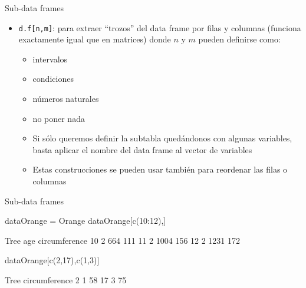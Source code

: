 \documentclass[
  ignorenonframetext,
  aspectratio=169]{beamer}
\newenvironment{Shaded}{\begin{snugshade}}{\end{snugshade}}
\newcommand{\DecValTok}[1]{\textcolor[rgb]{0.00,0.00,0.81}{#1}}
\newcommand{\FunctionTok}[1]{\textcolor[rgb]{0.00,0.00,0.00}{#1}}
\newcommand{\NormalTok}[1]{#1}
\newcommand{\OtherTok}[1]{\textcolor[rgb]{0.56,0.35,0.01}{#1}}
\newcommand{\SpecialCharTok}[1]{\textcolor[rgb]{0.00,0.00,0.00}{#1}}
\providecommand{\tightlist}{%
  \setlength{\itemsep}{0pt}\setlength{\parskip}{0pt}}
\let\oldverbatim\verbatim
\let\endoldverbatim\endverbatim
\renewenvironment{verbatim}{\tiny\oldverbatim}{\endoldverbatim}
\begin{document}
\begin{frame}[fragile]{Sub-data frames}
\protect\hypertarget{sub-data-frames}{}
\begin{itemize}
\tightlist
\item
  \texttt{d.f{[}n,m{]}}: para extraer ``trozos'' del data frame por
  filas y columnas (funciona exactamente igual que en matrices) donde
  \(n\) y \(m\) pueden definirse como:

  \begin{itemize}
  \tightlist
  \item
    intervalos
  \item
    condiciones
  \item
    números naturales
  \item
    no poner nada
  \item
    Si sólo queremos definir la subtabla quedándonos con algunas
    variables, basta aplicar el nombre del data frame al vector de
    variables
  \item
    Estas construcciones se pueden usar también para reordenar las filas
    o columnas
  \end{itemize}
\end{itemize}
\end{frame}

\begin{frame}[fragile]{Sub-data frames}
\protect\hypertarget{sub-data-frames-1}{}
\begin{Shaded}
\begin{Highlighting}[]
\NormalTok{dataOrange }\OtherTok{=}\NormalTok{ Orange}
\NormalTok{dataOrange[}\FunctionTok{c}\NormalTok{(}\DecValTok{10}\SpecialCharTok{:}\DecValTok{12}\NormalTok{),]}
\end{Highlighting}
\end{Shaded}

\begin{verbatim}
   Tree  age circumference
10    2  664           111
11    2 1004           156
12    2 1231           172
\end{verbatim}

\begin{Shaded}
\begin{Highlighting}[]
\NormalTok{dataOrange[}\FunctionTok{c}\NormalTok{(}\DecValTok{2}\NormalTok{,}\DecValTok{17}\NormalTok{),}\FunctionTok{c}\NormalTok{(}\DecValTok{1}\NormalTok{,}\DecValTok{3}\NormalTok{)]}
\end{Highlighting}
\end{Shaded}

\begin{verbatim}
   Tree circumference
2     1            58
17    3            75
\end{verbatim}
\end{frame}
\end{document}

